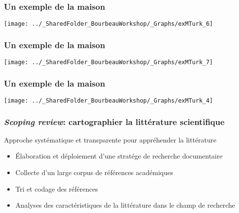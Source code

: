\documentclass{beamer}
\begin{document}

  \begin{frame}
	        \frametitle{Un exemple de la maison} \vspace{1cm}   
	        \begin{center}
	           \texttt{[image: ../\_SharedFolder\_BourbeauWorkshop/\_Graphs/exMTurk\_6]}
	        \end{center}  
	    \end{frame}
    

  \begin{frame}
	        \frametitle{Un exemple de la maison} \vspace{1cm}   
	        \begin{center}
	           \texttt{[image: ../\_SharedFolder\_BourbeauWorkshop/\_Graphs/exMTurk\_7]}
	        \end{center}  
	    \end{frame}
    

     \begin{frame}
	        \frametitle{Un exemple de la maison} \vspace{1cm}   
	        \begin{center}
	           \texttt{[image: ../\_SharedFolder\_BourbeauWorkshop/\_Graphs/exMTurk\_4]}
	        \end{center}  
	    \end{frame}
    

    \begin{frame}
    
      \frametitle{\emph{Scoping review}: cartographier la littérature scientifique} \vspace{1cm}
      
    Approche systématique et transparente pour appréhender la littérature
    
        \begin{itemize}
          \item{Élaboration et déploiement d'une stratége de recherche documentaire}
          \item{Collecte d'un large corpus de références académiques}
          \item{Tri et codage des références}
          \item{Analyses des caractéristiques de la littérature dans le champ de recherche}
        \end{itemize}
          
    \end{frame}  
    
\end{document}
